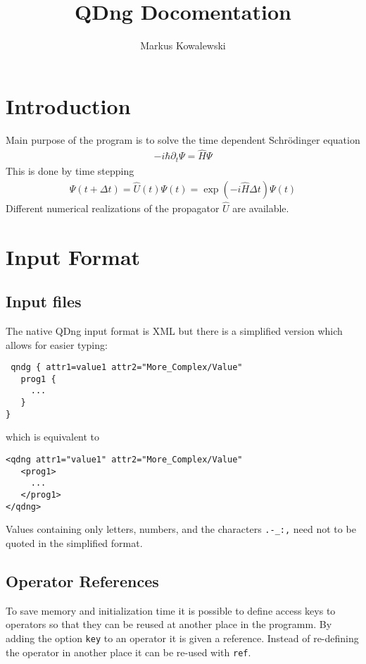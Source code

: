 \documentclass[a4paper,12pt]{scrbook}
\title{QDng Docomentation}
\author{Markus Kowalewski}
\begin{document}
\maketitle

\tableofcontents

\chapter{Introduction}
Main purpose of the program is to solve
the time dependent Schr\"odinger equation
\begin{align}
-i\hbar \partial_t \Psi = \hat H \Psi
\end{align}
This is done by time stepping
\begin{align}
\Psi(t+\Delta t) = \hat U(t) \Psi(t) = \exp\left(-i\hat H \Delta t \right) \Psi(t)
\end{align}
Different numerical realizations of the propagator
$\hat U$ are available. 



\chapter{Input Format}
\section{Input files}
The native QDng input format is XML but there is a simplified version which allows
for easier typing:
\begin{verbatim}
 qndg { attr1=value1 attr2="More_Complex/Value"
   prog1 {
     ...
   }
}
\end{verbatim}
which is equivalent to 
\begin{verbatim}
<qdng attr1="value1" attr2="More_Complex/Value"
   <prog1>
     ...
   </prog1>
</qdng>
\end{verbatim}
Values containing only letters, numbers, and the characters \verb|.-_:,| need not to
be quoted in the simplified format.

\section{Operator References}
To save memory and initialization time it is possible to define access keys to operators
so that they can be reused at another place in the programm. By adding the option \verb|key|
to an operator it is given a reference. Instead of re-defining the operator in another place
it can be re-used with \verb|ref|.
\end{document}
